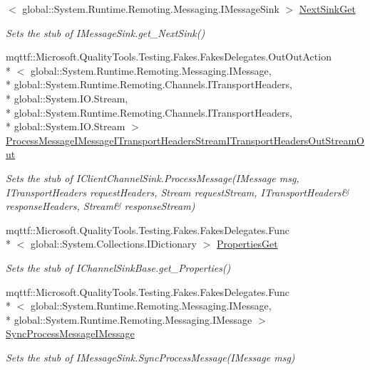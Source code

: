 \begin{DoxyCompactItemize}
$<$ global\-::\-System.\-Runtime.\-Remoting.\-Messaging.\-I\-Message\-Sink $>$ \hyperlink{class_system_1_1_runtime_1_1_remoting_1_1_channels_1_1_fakes_1_1_stub_i_client_formatter_sink_a625106d365e577e613ccce7f3e61a16a}{Next\-Sink\-Get}
\begin{DoxyCompactList}\small\item\em Sets the stub of I\-Message\-Sink.\-get\-\_\-\-Next\-Sink()\end{DoxyCompactList}\item 
mqttf\-::\-Microsoft.\-Quality\-Tools.\-Testing.\-Fakes.\-Fakes\-Delegates.\-Out\-Out\-Action\\*
$<$ global\-::\-System.\-Runtime.\-Remoting.\-Messaging.\-I\-Message, \\*
global\-::\-System.\-Runtime.\-Remoting.\-Channels.\-I\-Transport\-Headers, \\*
global\-::\-System.\-I\-O.\-Stream, \\*
global\-::\-System.\-Runtime.\-Remoting.\-Channels.\-I\-Transport\-Headers, \\*
global\-::\-System.\-I\-O.\-Stream $>$ \hyperlink{class_system_1_1_runtime_1_1_remoting_1_1_channels_1_1_fakes_1_1_stub_i_client_formatter_sink_a33afdb93f6abb714836333d1db941b7e}{Process\-Message\-I\-Message\-I\-Transport\-Headers\-Stream\-I\-Transport\-Headers\-Out\-Stream\-Out}
\begin{DoxyCompactList}\small\item\em Sets the stub of I\-Client\-Channel\-Sink.\-Process\-Message(I\-Message msg, I\-Transport\-Headers request\-Headers, Stream request\-Stream, I\-Transport\-Headers\& response\-Headers, Stream\& response\-Stream)\end{DoxyCompactList}\item 
mqttf\-::\-Microsoft.\-Quality\-Tools.\-Testing.\-Fakes.\-Fakes\-Delegates.\-Func\\*
$<$ global\-::\-System.\-Collections.\-I\-Dictionary $>$ \hyperlink{class_system_1_1_runtime_1_1_remoting_1_1_channels_1_1_fakes_1_1_stub_i_client_formatter_sink_a657112816d6a2a3d8cb41d228a84271a}{Properties\-Get}
\begin{DoxyCompactList}\small\item\em Sets the stub of I\-Channel\-Sink\-Base.\-get\-\_\-\-Properties()\end{DoxyCompactList}\item 
mqttf\-::\-Microsoft.\-Quality\-Tools.\-Testing.\-Fakes.\-Fakes\-Delegates.\-Func\\*
$<$ global\-::\-System.\-Runtime.\-Remoting.\-Messaging.\-I\-Message, \\*
global\-::\-System.\-Runtime.\-Remoting.\-Messaging.\-I\-Message $>$ \hyperlink{class_system_1_1_runtime_1_1_remoting_1_1_channels_1_1_fakes_1_1_stub_i_client_formatter_sink_a22f1f882b561ca719fb7882fca5f94b7}{Sync\-Process\-Message\-I\-Message}
\begin{DoxyCompactList}\small\item\em Sets the stub of I\-Message\-Sink.\-Sync\-Process\-Message(\-I\-Message msg)\end{DoxyCompactList}\end{DoxyCompactItemize}


